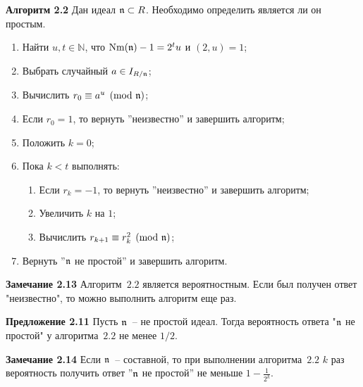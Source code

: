 \documentclass[_00_autoref.tex]{subfiles}
\begin{document}
\textbf{Алгоритм 2.2}\label{algorithm:miller_rabin}
    Дан идеал $\mathfrak{n} \subset R$.
    Необходимо определить является ли он простым.

    \begin{enumerate}
        \item Найти $u, t \in \mathbb{N}$, что $\textrm{Nm}(\mathfrak{n}) - 1 = 2^t u$ и $(2, u) = 1$;
        
        \item Выбрать случайный $a \in I_{R/\mathfrak{n}}$;

        \item Вычислить $r_0 \equiv a^u \pmod{\mathfrak{n}}$;

        \item Если $r_0 = 1$, то вернуть ''неизвестно'' и завершить алгоритм;

        \item Положить $k = 0$;

        \item Пока $k < t$ выполнять:
        \begin{enumerate}
            \item Если $r_k = -1$, то вернуть ''неизвестно'' и завершить алгоритм;

            \item Увеличить $k$ на $1$;

            \item Вычислить $r_{k+1} \equiv r_k^2 \pmod{\mathfrak{n}}$;
        \end{enumerate}

        \item Вернуть ''$\mathfrak{n}$ не простой'' и завершить алгоритм.
    \end{enumerate}

\textbf{Замечание 2.13}
    Алгоритм~$2.2$ является вероятностным.
    Если был получен ответ "неизвестно", то можно выполнить алгоритм еще раз.

\textbf{Предложение 2.11}
    Пусть $\mathfrak{n}$~-- не простой идеал.
    Тогда вероятность ответа "$\mathfrak{n}$ не простой" у алгоритма~$2.2$ не менее $1/2$.

\textbf{Замечание 2.14}
    Если $\mathfrak{n}$~-- составной, то при выполнении алгоритма~$2.2$ $k$ раз вероятность получить ответ ''$\mathfrak{n}$ не простой'' не меньше $1 - \frac{1}{2^k}$.

\end{document}
